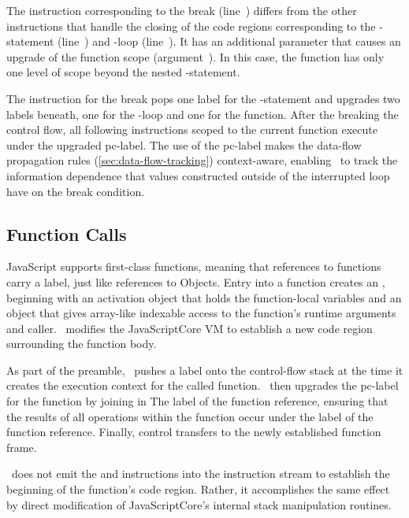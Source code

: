 The \popj instruction corresponding to the break (line~) differs from the other \popj instructions that handle the closing of the code regions corresponding to the -statement (line~) and -loop (line~).
It has an additional parameter that causes an upgrade of the function scope (argument~).
In this case, the function has only one level of scope beyond the nested -statement.

The \popj instruction for the break pops one label for the -statement and upgrades two labels beneath, one for the -loop and one for the function.
After the breaking the control flow, all following instructions scoped to the current function execute under the upgraded pc-label.
The use of the pc-label makes the data-flow propagation rules (\autoref{sec:data-flow-tracking}) context-aware, enabling \FlowCore\ to track the information dependence that values constructed outside of the interrupted loop have on the break condition.

\subsection{Function Calls}
\label{sec:function-calls}

JavaScript supports first-class functions, meaning that references to functions carry a label, just like references to Objects.
Entry into a function creates an \cite{ecma}, beginning with an activation object that holds the function-local variables and an  object that gives array-like indexable access to the function's runtime arguments and caller.
\FlowCore\ modifies the JavaScriptCore VM to establish a new code region surrounding the function body.

As part of the preamble, \FlowCore\ pushes a label onto the control-flow stack at the time it creates the execution context for the called function.
\FlowCore\ then upgrades the pc-label for the function by joining in The label of the function reference, ensuring that the results of all operations within the function occur under the label of the function reference.
Finally, control transfers to the newly established function frame.

\FlowCore\ does not emit the \dup and \join instructions into the instruction stream to establish the beginning of the function's code region.
Rather, it accomplishes the same effect by direct modification of JavaScriptCore's internal stack manipulation routines.

